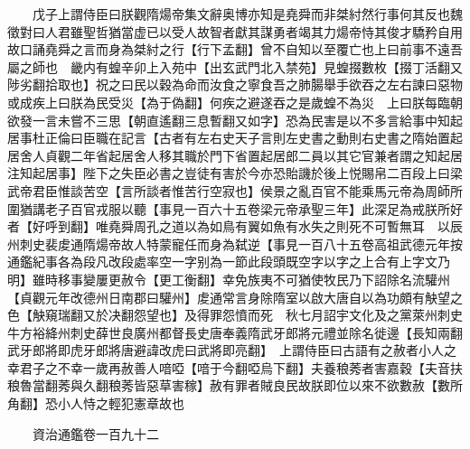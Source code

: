　　戊子上謂侍臣曰朕觀隋煬帝集文辭奥博亦知是堯舜而非桀紂然行事何其反也魏徵對曰人君雖聖哲猶當虚已以受人故智者獻其謀勇者竭其力煬帝恃其俊才驕矜自用故口誦堯舜之言而身為桀紂之行【行下孟翻】曾不自知以至覆亡也上曰前事不遠吾屬之師也　畿内有蝗辛卯上入苑中【出玄武門北入禁苑】見蝗掇數枚【掇丁活翻又陟劣翻拾取也】祝之曰民以穀為命而汝食之寧食吾之肺腸舉手欲吞之左右諫曰惡物或成疾上曰朕為民受災【為于偽翻】何疾之避遂吞之是歲蝗不為災　上曰朕每臨朝欲發一言未嘗不三思【朝直遙翻三息暫翻又如字】恐為民害是以不多言給事中知起居事杜正倫曰臣職在記言【古者有左右史天子言則左史書之動則右史書之隋始置起居舍人貞觀二年省起居舍人移其職於門下省置起居郎二員以其它官兼者謂之知起居注知起居事】陛下之失臣必書之豈徒有害於今亦恐貽譏於後上悦賜帛二百段上曰梁武帝君臣惟談苦空【言所談者惟苦行空寂也】侯景之亂百官不能乘馬元帝為周師所圍猶講老子百官戎服以聽【事見一百六十五卷梁元帝承聖三年】此深足為戒朕所好者【好呼到翻】唯堯舜周孔之道以為如鳥有翼如魚有水失之則死不可暫無耳　以辰州刺史裴䖍通隋煬帝故人特蒙寵任而身為弑逆【事見一百八十五卷高祖武德元年按通鑑紀事各為段凡改段處率空一字别為一節此段頭既空字以字之上合有上字文乃明】雖時移事變屢更赦令【更工衡翻】幸免族夷不可猶使牧民乃下詔除名流驩州【貞觀元年改德州日南郡曰驩州】䖍通常言身除隋室以啟大唐自以為功頗有觖望之色【觖窺瑞翻又於决翻怨望也】及得罪怨憤而死　秋七月詔宇文化及之黨萊州刺史牛方裕絳州刺史薛世良廣州都督長史唐奉義隋武牙郎將元禮並除名徙邊【長知兩翻武牙郎將即虎牙郎將唐避諱改虎曰武將即亮翻】　上謂侍臣曰古語有之赦者小人之幸君子之不幸一歲再赦善人喑啞【喑于今翻啞烏下翻】夫養稂莠者害嘉穀【夫音扶稂魯當翻莠與久翻稂莠皆惡草害稼】赦有罪者賊良民故朕即位以來不欲數赦【數所角翻】恐小人恃之輕犯憲章故也

　　資治通鑑卷一百九十二  
    


 


 



 

 
  







 


　　
　　
　
　
　


　　

　















